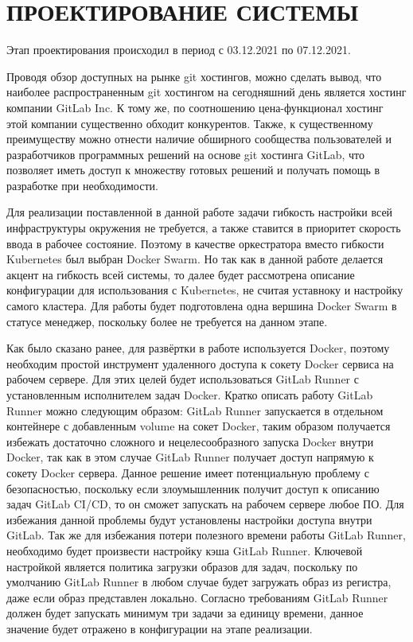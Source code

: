 \section{ПРОЕКТИРОВАНИЕ СИСТЕМЫ}

Этап проектирования происходил в период с 03.12.2021 по 07.12.2021.

Проводя обзор доступных на рынке git хостингов, можно сделать вывод, что наиболее распространенным git хостингом на сегодняшний день является хостинг компании GitLab Inc.
К тому же, по соотношению цена-функционал хостинг этой компании существенно обходит конкурентов.
Также, к существенному преимуществу можно отнести наличие обширного сообщества пользователей и разработчиков программных решений на основе git хостинга GitLab,
что позволяет иметь доступ к множеству готовых решений и получать помощь в разработке при необходимости.

Для реализации поставленной в данной работе задачи гибкость настройки всей инфраструктуры окружения не требуется, а также ставится в приоритет скорость ввода в рабочее состояние.
Поэтому в качестве оркестратора вместо гибкости Kubernetes был выбран Docker Swarm.
Но так как в данной работе делается акцент на гибкость всей системы, то далее будет рассмотрена описание конфигурации для использования с Kubernetes, не считая уставноку и настройку самого кластера.
Для работы будет подготовлена одна вершина Docker Swarm в статусе менеджер, поскольку более не требуется на данном этапе.

Как было сказано ранее, для развёртки в работе используется Docker, поэтому необходим простой инструмент удаленного доступа к сокету Docker сервиса на рабочем сервере.
Для этих целей будет использоваться GitLab Runner с установленным исполнителем задач Docker.
Кратко описать работу GitLab Runner можно следующим образом: GitLab Runner запускается в отдельном контейнере с добавленным volume на сокет Docker,
таким образом получается избежать достаточно сложного и нецелесообразного запуска Docker внутри Docker,
так как в этом случае GitLab Runner получает доступ напрямую к сокету Docker сервера.
Данное решение имеет потенциальную проблему с безопасностью, поскольку если злоумышленник получит доступ к описанию задач GitLab CI/CD, то он сможет запускать на рабочем сервере любое ПО.
Для избежания данной проблемы будут установлены настройки доступа внутри GitLab.
Так же для избежания потери полезного времени работы GitLab Runner, необходимо будет произвести настройку кэша GitLab Runner.
Ключевой настройкой является политика загрузки образов для задач, поскольку по умолчанию GitLab Runner в любом случае будет загружать образ из регистра, даже если образ представлен локально.
Согласно требованиям GitLab Runner должен будет запускать минимум три задачи за единицу времени, данное значение будет отражено в конфигурации на этапе реализации.

